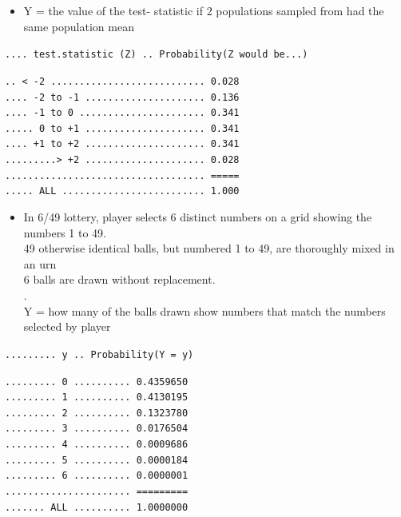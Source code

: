 \documentclass[]{book}
\providecommand{\tightlist}{%
  \setlength{\itemsep}{0pt}\setlength{\parskip}{0pt}}
\begin{document}
\begin{itemize}
\tightlist
\item
  Y = the value of the test- statistic if 2 populations sampled from had the same population mean
\end{itemize}

\texttt{....\ test.statistic\ (Z)\ ..\ Probability(Z\ would\ be...)}

\texttt{..\ \textless{}\ -2\ ...........................\ 0.028}\\
\texttt{....\ -2\ to\ -1\ .....................\ 0.136}~\\
\texttt{....\ -1\ to\ 0\ ......................\ 0.341}~\\
\texttt{.....\ 0\ to\ +1\ .....................\ 0.341}~\\
\texttt{....\ +1\ to\ +2\ .....................\ 0.341}~\\
\texttt{.........\textgreater{}\ +2\ .....................\ 0.028}~\\
\texttt{...................................\ =====}~\\
\texttt{.....\ ALL\ .........................\ 1.000}

\begin{itemize}
\tightlist
\item
  In 6/49 lottery, player selects 6 distinct numbers on a grid showing the numbers 1 to 49.\\
  49 otherwise identical balls, but numbered 1 to 49, are thoroughly mixed in an urn\\
  6 balls are drawn without replacement.\\
  .\\
  Y = how many of the balls drawn show numbers that match the numbers selected by player
\end{itemize}

\texttt{.........\ y\ ..\ Probability(Y\ =\ y)}

\texttt{.........\ 0\ ..........\ 0.4359650}\\
\texttt{.........\ 1\ ..........\ 0.4130195}~\\
\texttt{.........\ 2\ ..........\ 0.1323780}~\\
\texttt{.........\ 3\ ..........\ 0.0176504}~\\
\texttt{.........\ 4\ ..........\ 0.0009686}~\\
\texttt{.........\ 5\ ..........\ 0.0000184}~\\
\texttt{.........\ 6\ ..........\ 0.0000001}~\\
\texttt{......................\ =========}~\\
\texttt{.......\ ALL\ ..........\ 1.0000000}
\end{document}
